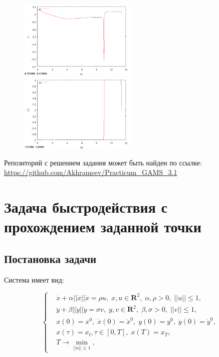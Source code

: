 \documentclass[14pt]{article}
\begin{document}
\begin{figure}
\begin{floatrow}
    {\includegraphics[width=0.5\textwidth]{task2_u1}}
    {\includegraphics[width=0.5\textwidth]{task2_u2}}
\end{floatrow}
\end{figure}

Репозиторий с решением задания может быть найден по ссылке:
\url{https://github.com/Akhrameev/Practicum_GAMS_3.1}

\newpage

\section{Задача быстродействия с прохождением заданной точки}
\subsection{Постановка задачи}

Система имеет вид:

\begin{equation}\label{syst3}
\left\{ \begin{aligned}
& \ddot{x}+\alpha||\dot{x}||\dot{x} = \rho u, \; x,u \in \textbf{R}^2, \; \alpha,\rho > 0,\;  ||u|| \le 1, \\
& \ddot{y}+\beta||\dot{y}||\dot{y} = \sigma v, \; y,v \in \textbf{R}^2, \; \beta,\sigma > 0,\;  ||v|| \le 1, \\
& x(0)=x^0, \; \dot{x}(0) = \dot{x}^0, \; y(0)=y^0, \; \dot{y}(0) = \dot{y}^0, \\
& x(\tau)=x_t, \tau \in [0,T], \; x(T)=x_T, \\
& T \rightarrow \min_{||u|| \le 1},
\end{aligned}\right.
\end{equation}
\end{document}
